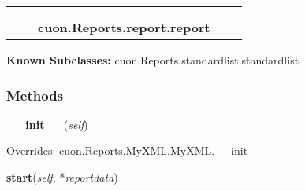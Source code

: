     \label{cuon:Reports:report:report}
\begin{tabular}{cccccc}
\multicolumn{2}{r}{\settowidth{\BCL}{cuon.Reports.MyXML.MyXML}\multirow{2}{\BCL}{cuon.Reports.MyXML.MyXML}}
&&
  \\\cline{3-3}
  &&\multicolumn{1}{c|}{}
&&
  \\
&&\multicolumn{2}{l}{\textbf{cuon.Reports.report.report}}
\end{tabular}

\textbf{Known Subclasses:} cuon.Reports.standardlist.standardlist



  \subsubsection{Methods}

    \vspace{0.5ex}

\hspace{.8\funcindent}\begin{boxedminipage}{\funcwidth}

    \raggedright \textbf{\_\_init\_\_}(\textit{self})

\setlength{\parskip}{2ex}
\setlength{\parskip}{1ex}
      Overrides: cuon.Reports.MyXML.MyXML.\_\_init\_\_

    \end{boxedminipage}

    \label{cuon:Reports:report:report:start}

    \vspace{0.5ex}

\hspace{.8\funcindent}\begin{boxedminipage}{\funcwidth}

    \raggedright \textbf{start}(\textit{self}, *\textit{reportdata})

\setlength{\parskip}{2ex}
\setlength{\parskip}{1ex}
    \end{boxedminipage}

